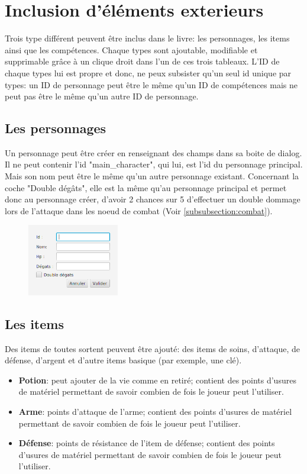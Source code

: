 \chapter{Inclusion d'éléments exterieurs}\label{chapter:inclus}
	Trois type différent peuvent être inclus dans le livre: les personnages, les items ainsi que les compétences. Chaque types sont ajoutable, modifiable et supprimable grâce à un clique droit dans l'un de ces trois tableaux.
	L'ID de chaque types lui est propre et donc, ne peux subsister qu'un seul id unique par types: un ID de personnage peut être le même qu'un ID de compétences mais ne peut pas être le même qu'un autre ID de personnage.

	\section{Les personnages}
		Un personnage peut être créer en renseignant des champs dans sa boite de dialog. Il ne peut contenir l'id "main\_character", qui lui, est l'id du personnage principal. Mais son nom peut être le même qu'un autre personnage existant.
		Concernant la coche "Double dégâts", elle est la même qu'au personnage principal et permet donc au personnage créer, d'avoir 2 chances sur 5 d'effectuer un double dommage lors de l'attaque dans les noeud de combat (Voir \ref{subsubsection:combat}).
	\begin{figure}[H]
		\centering\includegraphics[width=4cm]{img/inclusPersonnages.png}
	\end{figure}

	\section{Les items}
		Des items de toutes sortent peuvent être ajouté: des items de soins, d'attaque, de défense, d'argent et d'autre items basique (par exemple, une clé).
		\begin{itemize}
			\item \textbf{Potion}: peut ajouter de la vie comme en retiré; contient des points d'usures de matériel permettant de savoir combien de fois le joueur peut l'utiliser.
			\item \textbf{Arme}: points d'attaque de l'arme; contient des points d'usures de matériel permettant de savoir combien de fois le joueur peut l'utiliser.
			\item \textbf{Défense}: points de résistance de l'item de défense; contient des points d'usures de matériel permettant de savoir combien de fois le joueur peut l'utiliser.\\
		\end{itemize}

